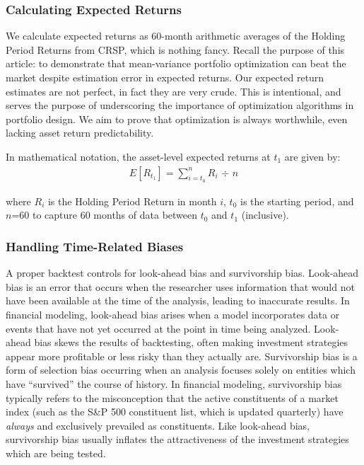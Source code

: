 \documentclass[12pt,letterpaper]{article}
\begin{document}
\subsubsection{Calculating Expected Returns}
We calculate expected returns as 60-month arithmetic averages of the Holding Period Returns from CRSP, which is nothing fancy. Recall the purpose of this article: to demonstrate that mean-variance portfolio optimization can beat the market despite estimation error in expected returns. Our expected return estimates are not perfect, in fact they are very crude. This is intentional, and serves the purpose of underscoring the importance of optimization algorithms in portfolio design. We aim to prove that optimization is always worthwhile, even lacking asset return predictability.

In mathematical notation, the asset-level expected returns at $t_1$ are given by:
\begin{align}
E[R_{t_1}] = \sum_{i=t_0}^nR_i \text{ ÷ } n
\label{eq:expectedRetCalc}
\end{align}

where $R_i$ is the Holding Period Return in month $i$, $t_0$ is the starting period, and $n$=60 to capture 60 months of data between $t_0$ and $t_1$ (inclusive).

\subsubsection{Handling Time-Related Biases}
A proper backtest controls for look-ahead bias and survivorship bias. Look-ahead bias is an error that occurs when the researcher uses information that would not have been available at the time of the analysis, leading to inaccurate results. In financial modeling, look-ahead bias arises when a model incorporates data or events that have not yet occurred at the point in time being analyzed. Look-ahead bias skews the results of backtesting, often making investment strategies appear more profitable or less risky than they actually are. Survivorship bias is a form of selection bias occurring when an analysis focuses solely on entities which have “survived” the course of history. In financial modeling, survivorship bias typically refers to the misconception that the active constituents of a market index (such as the S\&P 500 constituent list, which is updated quarterly) have \textit{always} and exclusively prevailed as constituents. Like look-ahead bias, survivorship bias usually inflates the attractiveness of the investment strategies which are being tested.
\end{document}
